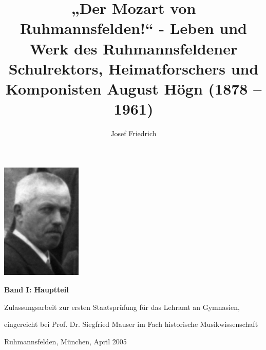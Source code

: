 \documentclass[a4paper]{article}
\title{„Der Mozart von Ruhmannsfelden!“ - Leben und Werk des
Ruhmannsfeldener Schulrektors, Heimatforschers und Komponisten August
Högn (1878 – 1961)}
\author{Josef Friedrich}
\begin{document}
\maketitle

{\centering
\includegraphics[width=3.836cm,height=5.556cm]{pictures/August-Hoegn_Nachruf.jpg}
 \par}
{\centering\bfseries
Band I: Hauptteil
\par}

{\centering
Zulassungsarbeit zur ersten Staatsprüfung für das Lehramt an Gymnasien,
\par}

{\centering
eingereicht bei Prof. Dr. Siegfried Mauser im Fach historische
Musikwissenschaft
\par}

{\centering
Ruhmannsfelden, München, April 2005
\par}


\tableofcontents










































\end{document}
